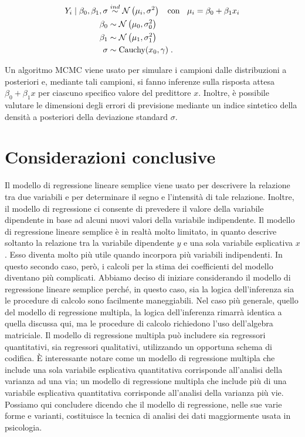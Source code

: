 \documentclass[
]{memoir}
\begin{document}
\begin{align} 
Y_i \mid \beta_0, \beta_1, \sigma  &\stackrel{ind}{\sim} \mathcal{N}\left(\mu_i, \sigma^2\right) \;\; \text{ con } \;\; \mu_i = \beta_0 + \beta_1 x_i \notag\\
\beta_0  &\sim \mathcal{N}\left(\mu_0, \sigma_0^2 \right)  \notag\\
\beta_1  & \sim \mathcal{N}\left(\mu_1, \sigma_1^2 \right) \notag\\
\sigma & \sim \text{Cauchy}(x_0, \gamma) \; .\notag
\end{align}

Un algoritmo MCMC viene usato per simulare i campioni dalle distribuzioni a posteriori e, mediante tali campioni, si fanno inferenze sulla risposta attesa \(\beta_0 + \beta_1 x\) per ciascuno specifico valore del predittore \(x\). Inoltre, è possibile valutare le dimensioni degli errori di previsione mediante un indice sintetico della densità a posteriori della deviazione standard \(\sigma\).

\hypertarget{considerazioni-conclusive}{%
\section*{Considerazioni conclusive}\label{considerazioni-conclusive}}

Il modello di regressione lineare semplice viene usato per descrivere la
relazione tra due variabili e per determinare il segno e l'intensità di
tale relazione. Inoltre, il modello di regressione ci consente di
prevedere il valore della variabile dipendente in base ad alcuni nuovi
valori della variabile indipendente. Il modello di regressione lineare
semplice è in realtà molto limitato, in quanto descrive soltanto la
relazione tra la variabile dipendente \(y\) e una sola variabile
esplicativa \(x\). Esso diventa molto più utile quando incorpora più
variabili indipendenti. In questo secondo caso, però, i calcoli per la
stima dei coefficienti del modello diventano più complicati. Abbiamo
deciso di iniziare considerando il modello di regressione lineare semplice
perché, in questo caso, sia la logica dell'inferenza sia le procedure di
calcolo sono facilmente maneggiabili. Nel caso più generale, quello del
modello di regressione multipla, la logica dell'inferenza rimarrà
identica a quella discussa qui, ma le procedure di calcolo richiedono
l'uso dell'algebra matriciale. Il modello di regressione multipla può includere sia regressori quantitativi, sia regressori qualitativi, utilizzando un
opportuna schema di codifica. È interessante notare come un modello di
regressione multipla che include una sola variabile esplicativa
quantitativa corrisponde all'analisi della varianza ad una via; un
modello di regressione multipla che include più di una variabile
esplicativa quantitativa corrisponde all'analisi della varianza più vie.
Possiamo qui concludere dicendo che il modello di regressione, nelle sue varie forme e varianti, costituisce la tecnica di analisi dei dati maggiormente usata in psicologia.
\end{document}
